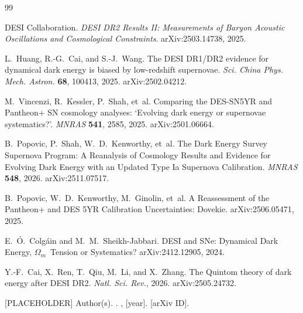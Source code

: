 \documentclass[11pt]{article}
\newcommand{\Om}{\ensuremath{\Omega_m}}
\begin{document}

\begin{thebibliography}{99}
\providecommand{\natexlab}[1]{#1}

DESI Collaboration.
\newblock \emph{DESI DR2 Results II: Measurements of Baryon Acoustic Oscillations and Cosmological Constraints}.
\newblock arXiv:2503.14738, 2025.

L.~Huang, R.-G.~Cai, and S.-J.~Wang.
\newblock The DESI DR1/DR2 evidence for dynamical dark energy is biased by low-redshift supernovae.
\newblock \emph{Sci. China Phys. Mech. Astron.} \textbf{68}, 100413, 2025. arXiv:2502.04212.

M.~Vincenzi, R.~Kessler, P.~Shah, et~al.
\newblock Comparing the DES-SN5YR and Pantheon+ SN cosmology analyses: `Evolving dark energy or supernovae systematics?'.
\newblock \emph{MNRAS} \textbf{541}, 2585, 2025. arXiv:2501.06664.

B.~Popovic, P.~Shah, W.~D.~Kenworthy, et~al.
\newblock The Dark Energy Survey Supernova Program: A Reanalysis of Cosmology Results and Evidence for Evolving Dark Energy with an Updated Type Ia Supernova Calibration.
\newblock \emph{MNRAS} \textbf{548}, 2026. arXiv:2511.07517.

B.~Popovic, W.~D.~Kenworthy, M.~Ginolin, et~al.
\newblock A Reassessment of the Pantheon+ and DES 5YR Calibration Uncertainties: Dovekie.
\newblock arXiv:2506.05471, 2025.

E.~\'O.~Colg\'ain and M.~M.~Sheikh-Jabbari.
\newblock DESI and SNe: Dynamical Dark Energy, \Om\ Tension or Systematics?
\newblock arXiv:2412.12905, 2024.

Y.-F.~Cai, X.~Ren, T.~Qiu, M.~Li, and X.~Zhang.
\newblock The Quintom theory of dark energy after DESI DR2.
\newblock \emph{Natl. Sci. Rev.}, 2026. arXiv:2505.24732.

[PLACEHOLDER] Author(s).
.
\newblock [Venue], [year]. [arXiv ID].

\end{thebibliography}
\end{document}
